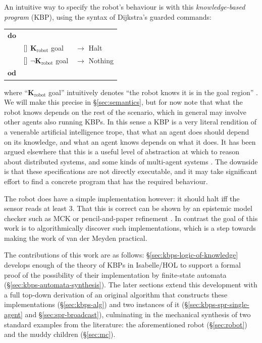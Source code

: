 \documentclass{llncs}
\begin{document}
An intuitive way to specify the robot's behaviour is with this
\emph{knowledge-based program} (KBP), using the syntax of Dijkstra's
guarded commands:
\begin{center}
  \begin{tabular}{lll}
    $\mathbf{do}$\\
     & $\mathbin{[]}$ $\mathbf{K}_{\mbox{robot}}$ goal & $\rightarrow$ Halt\\
     & $\mathbin{[]}$ $\lnot\mathbf{K}_{\mbox{robot}}$ goal & $\rightarrow$ Nothing\\
    $\mathbf{od}$\\
  \end{tabular}
\end{center}
where ``$\mathbf{K}_{\mbox{robot}}$ goal'' intuitively denotes ``the
robot knows it is in the goal region''
\cite[Example~7.2.2]{FHMV:1995}. We will make this precise in
\S\ref{sec:semantics}, but for now note that what the robot knows
depends on the rest of the scenario, which in general may involve
other agents also running KBPs. In this sense a KBP is a very literal
rendition of a venerable artificial intelligence trope, that what an
agent does should depend on its knowledge, and what an agent knows
depends on what it does. It has been argued elsewhere
\cite{DBLP:conf/lpar/BickfordCHP04,EvdMM2000:FOSSACS,FHMV:1995} that
this is a useful level of abstraction at which to reason about
distributed systems, and some kinds of multi-agent systems
\cite{Shoham:2008}. The downside is that these specifications are not
directly executable, and it may take significant effort to find
a concrete program that has the required behaviour.

The robot does have a simple implementation however: it should halt
iff the sensor reads at least 3. That this is correct can be shown by
an epistemic model checker such as MCK \cite{DBLP:conf/cav/GammieM04}
or pencil-and-paper refinement \cite{EvdMM2000:FOSSACS}. In contrast
the goal of this work is to algorithmically discover such
implementations, which is a step towards making the work of van der
Meyden \cite{Ron:1996} practical.

The contributions of this work are as follows:
\S\ref{sec:kbps-logic-of-knowledge} develops enough of the theory of
KBPs in Isabelle/HOL \cite{Nipkow-Paulson-Wenzel:2002} to support a
formal proof of the possibility of their implementation by
finite-state automata (\S\ref{sec:kbps-automata-synthesis}). The later
sections extend this development with a full top-down derivation of an
original algorithm that constructs these implementations
(\S\ref{sec:kbps-alg}) and two instances of it
(\S\ref{sec:kbps-spr-single-agent} and \S\ref{sec:spr-broadcast}),
culminating in the mechanical synthesis of two standard examples from
the literature: the aforementioned robot (\S\ref{sec:robot}) and the
muddy children (\S\ref{sec:mc}).
\end{document}
